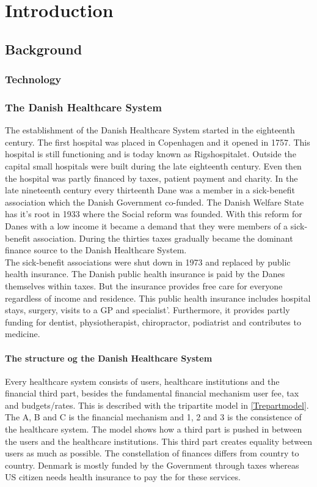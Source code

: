 \chapter{Introduction}

\section{Background}
\subsection{Technology}
\subsection{The Danish Healthcare System}



The establishment of the Danish Healthcare System started in the eighteenth century. The first hospital was placed in Copenhagen and it opened in 1757. This hospital is still functioning and is today known as Rigshospitalet. Outside the capital small hospitals were built during the late eighteenth century. Even then the hospital was partly financed by taxes, patient payment and charity. In the late nineteenth century every thirteenth Dane was a member in a sick-benefit association which the Danish Government co-funded. The Danish Welfare State has it's root in 1933 where the Social reform was founded. With this reform for Danes with a low income it became a demand that they were members of a sick-benefit association. During the thirties taxes gradually became the dominant finance source to the Danish Healthcare System.\\ 
The sick-benefit associations were shut down in 1973 and replaced by public health insurance. The Danish public health insurance is paid by the Danes themselves within taxes. But the insurance provides free care for everyone regardless of income and residence. This public health insurance includes hospital stays, surgery, visits to a GP and specialist'. Furthermore, it provides partly funding for dentist, physiotherapist, chiropractor, podiatrist and contributes to medicine.   \\

\subsubsection{The structure og the Danish Healthcare System}
Every healthcare system consists of users, healthcare institutions and the financial third part, besides the fundamental financial mechanism user fee, tax and budgets/rates. This is described with the tripartite model in \cref{Trepartmodel}. The A, B and C is the financial mechanism and 1, 2 and 3 is the consistence of the healthcare system. The model shows how a third part is pushed in between the users and the healthcare institutions. This third part creates equality between users as much as possible. The constellation of finances differs from country to country. Denmark is mostly funded by the Government through taxes whereas US citizen needs health insurance to pay the for these services\cite{sundhedsvaesen}. \\


